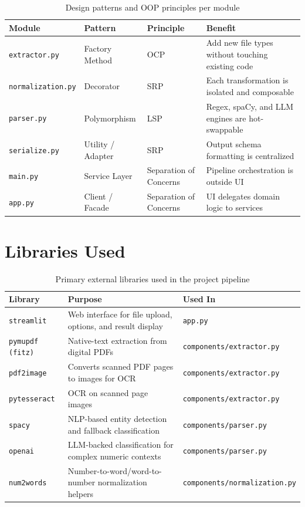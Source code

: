 \documentclass[12pt, a4paper]{article}
\begin{document}
\begin{table}[H]
\centering
\renewcommand{\arraystretch}{1.35}
\begin{tabular}{l l l p{4.8cm}}
\toprule
\textbf{Module} & \textbf{Pattern} & \textbf{Principle} & \textbf{Benefit} \\
\midrule
\texttt{extractor.py}      & Factory Method & OCP & Add new file types without touching existing code \\
\texttt{normalization.py}  & Decorator      & SRP & Each transformation is isolated and composable \\
\texttt{parser.py}         & Polymorphism   & LSP & Regex, spaCy, and LLM engines are hot-swappable \\
\texttt{serialize.py}      & Utility / Adapter & SRP & Output schema formatting is centralized \\
\texttt{main.py}           & Service Layer  & Separation of Concerns & Pipeline orchestration is outside UI \\
\texttt{app.py}            & Client / Facade & Separation of Concerns & UI delegates domain logic to services \\
\bottomrule
\end{tabular}
\caption{Design patterns and OOP principles per module}
\end{table}

\section{Libraries Used}

\begin{table}[H]
\centering
\renewcommand{\arraystretch}{1.3}
\begin{tabular}{l p{5.2cm} p{4.8cm}}
\toprule
\textbf{Library} & \textbf{Purpose} & \textbf{Used In} \\
\midrule
\texttt{streamlit} & Web interface for file upload, options, and result display & \texttt{app.py} \\
\texttt{pymupdf (fitz)} & Native-text extraction from digital PDFs & \texttt{components/extractor.py} \\
\texttt{pdf2image} & Converts scanned PDF pages to images for OCR & \texttt{components/extractor.py} \\
\texttt{pytesseract} & OCR on scanned page images & \texttt{components/extractor.py} \\
\texttt{spacy} & NLP-based entity detection and fallback classification & \texttt{components/parser.py} \\
\texttt{openai} & LLM-backed classification for complex numeric contexts & \texttt{components/parser.py} \\
\texttt{num2words} & Number-to-word/word-to-number normalization helpers & \texttt{components/normalization.py} \\
\bottomrule
\end{tabular}
\caption{Primary external libraries used in the project pipeline}
\end{table}
 
\end{document}
